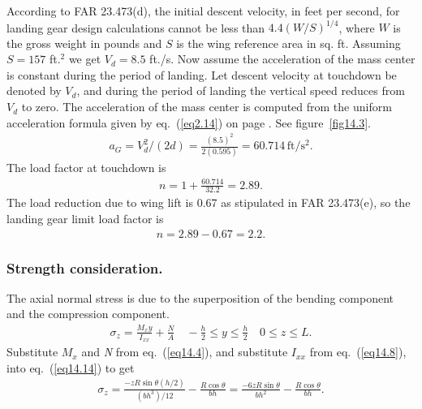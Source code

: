 \documentclass{AeroStructure-ERJohnson}
\begin{document}
\vspace*{-1pc}

\noindent According to FAR 23.473(d), the initial descent velocity, in feet per second, for landing gear design calculations cannot be less than $4.4(W/S)^{1/4}$, where $W$ is the gross weight in pounds and $S$ is the wing reference area in sq. ft. Assuming $\textit{S} = 157$ ft.$^2$ we get $V_{d}=8.5$ ft./s. Now assume the acceleration of the mass center is constant during the period of landing. Let descent velocity at touchdown be denoted by $V_{d}$, and during the period of landing the vertical speed reduces from $V_{d}$ to zero. The acceleration of the mass center is computed from the uniform acceleration formula given by eq.~(\ref{eq2.14}) on page \pageref{eq2.14}. See figure~\ref{fig14.3}.
\begin{align}\label{eq14.11}
a_{G}=V_{d}^{2} /(2 d)=\frac{(8.5)^{2}}{2(0.595)}=60.714\,\mathrm{ft}/\mathrm{s}^{2}.
\end{align}
The load factor at touchdown is
\begin{align}\label{eq14.12}
n=1+\frac{60.714}{32.2}=2.89.
\end{align}
The load reduction due to wing lift is 0.67 as stipulated in FAR 23.473(e), so the landing gear limit load factor is
\begin{align}\label{eq14.13}
n=2.89-0.67=2.2.
\end{align}

\subsubsection{Strength consideration.} The axial normal stress is due to the superposition of the bending component and the compression component.
\begin{align}\label{eq14.14}
\sigma_{z}=\frac{M_{x} y}{I_{x x}}+\frac{N}{A} \quad-\frac{h}{2} \leq y \leq \frac{h}{2} \quad 0 \leq z \leq L.
\end{align}
Substitute ${M}_x$ and \textit{N} from eq.~(\ref{eq14.4}), and substitute ${I}_{xx}$ from eq.~(\ref{eq14.8}), into eq.~(\ref{eq14.14}) to get
\begin{align}\label{eq14.15}
\sigma_{z}=\frac{-z R \sin \theta(h/2)}{\left(b h^{3}\right)/12}-\frac{R \cos \theta}{b h}=\frac{-6 z R \sin \theta}{b h^{2}}-\frac{R \cos \theta}{b h}.
\end{align}

\vspace*{-1.4pc}
\end{document}
